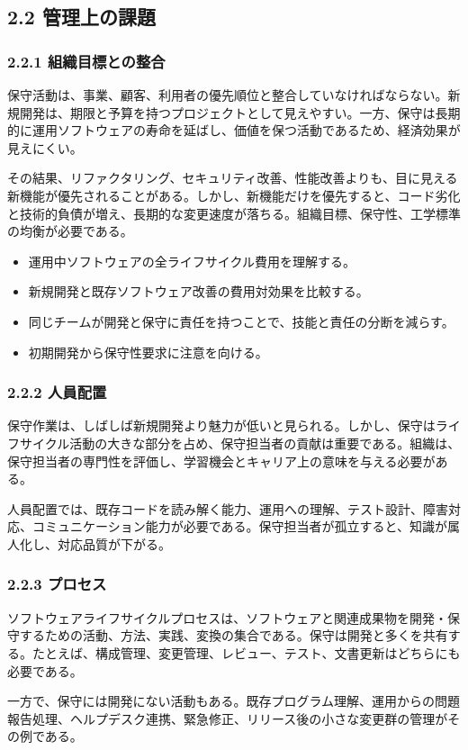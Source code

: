 \documentclass[a4paper,11pt]{ltjsarticle}
\begin{document}
\subsection{2.2 管理上の課題}
\subsubsection{2.2.1 組織目標との整合}
保守活動は、事業、顧客、利用者の優先順位と整合していなければならない。新規開発は、期限と予算を持つプロジェクトとして見えやすい。一方、保守は長期的に運用ソフトウェアの寿命を延ばし、価値を保つ活動であるため、経済効果が見えにくい。\par
その結果、リファクタリング、セキュリティ改善、性能改善よりも、目に見える新機能が優先されることがある。しかし、新機能だけを優先すると、コード劣化と技術的負債が増え、長期的な変更速度が落ちる。組織目標、保守性、工学標準の均衡が必要である。\par
\begin{itemize}
\item 運用中ソフトウェアの全ライフサイクル費用を理解する。
\item 新規開発と既存ソフトウェア改善の費用対効果を比較する。
\item 同じチームが開発と保守に責任を持つことで、技能と責任の分断を減らす。
\item 初期開発から保守性要求に注意を向ける。
\end{itemize}
\subsubsection{2.2.2 人員配置}
保守作業は、しばしば新規開発より魅力が低いと見られる。しかし、保守はライフサイクル活動の大きな部分を占め、保守担当者の貢献は重要である。組織は、保守担当者の専門性を評価し、学習機会とキャリア上の意味を与える必要がある。\par
人員配置では、既存コードを読み解く能力、運用への理解、テスト設計、障害対応、コミュニケーション能力が必要である。保守担当者が孤立すると、知識が属人化し、対応品質が下がる。\par
\subsubsection{2.2.3 プロセス}
ソフトウェアライフサイクルプロセスは、ソフトウェアと関連成果物を開発・保守するための活動、方法、実践、変換の集合である。保守は開発と多くを共有する。たとえば、構成管理、変更管理、レビュー、テスト、文書更新はどちらにも必要である。\par
一方で、保守には開発にない活動もある。既存プログラム理解、運用からの問題報告処理、ヘルプデスク連携、緊急修正、リリース後の小さな変更群の管理がその例である。\par
\end{document}
